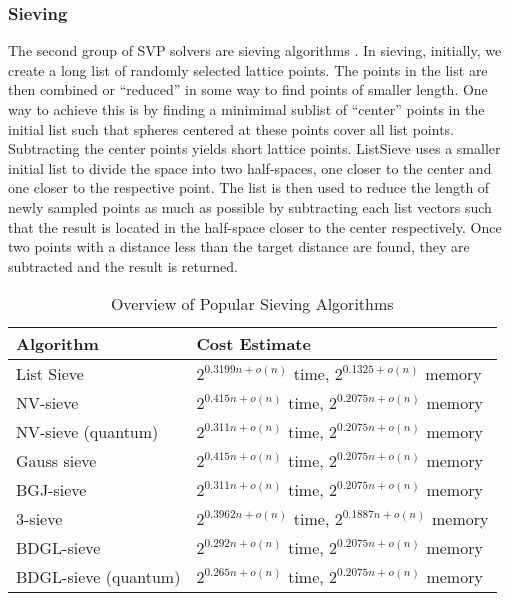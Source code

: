\subsubsection{Sieving}
The second group of SVP solvers are sieving algorithms \cite{ADHKPS19, MV10, NV08, BGJ15, BLS16, HK17,BDGL16}. In sieving, initially, we create a long list of randomly selected lattice points. The points in the list are then combined or ``reduced'' in some way to find points of smaller length. One way to achieve this is by finding a minimimal sublist of ``center'' points in the initial list such that spheres centered at these points cover all list points. Subtracting the center points yields short lattice points. ListSieve \cite{MV10} uses a smaller initial list to divide the space into two half-spaces, one closer to the center and one closer to the respective point. The list is then used to reduce the length of newly sampled points as much as possible by subtracting each list vectors such that the result is located in the half-space closer to the center respectively. Once two points with a distance less than the target distance are found, they are subtracted and the result is returned.

\begin{table}[h]
  \centering
  \begin{tabular}{ll}
    \toprule
    Algorithm                                & Cost Estimate                                          \\\hline
    List Sieve \cite{MV10}                   & $2^{0.3199n + o(n)}$ time, $2^{0.1325 + o(n)}$ memory  \\
    NV-sieve \cite{NV08, ADHKPS19}           & $2^{0.415n + o(n)}$ time, $2^{0.2075n + o(n)}$ memory  \\
    NV-sieve (quantum) \cite{NV08, ADHKPS19} & $2^{0.311n + o(n)}$ time, $2^{0.2075n + o(n)}$ memory  \\
    Gauss sieve \cite{MV10, HK17}            & $2^{0.415n + o(n)}$ time, $2^{0.2075n + o(n)}$ memory  \\
    BGJ-sieve \cite{BGJ15}                   & $2^{0.311n + o(n)}$ time, $2^{0.2075n + o(n)}$ memory  \\
    3-sieve \cite{BLS16, HK17}               & $2^{0.3962n + o(n)}$ time, $2^{0.1887n + o(n)}$ memory \\
    BDGL-sieve \cite{BDGL16}                 & $2^{0.292n + o(n)}$ time, $2^{0.2075n + o(n)}$ memory  \\
    BDGL-sieve (quantum) \cite{BDGL16}       & $2^{0.265n + o(n)}$ time, $2^{0.2075n + o(n)}$ memory  \\
    \bottomrule
  \end{tabular}
  \caption{Overview of Popular Sieving Algorithms} %
  \label{tab:sieving}
\end{table}

